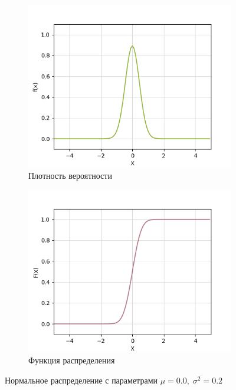 \begin{figure}[H]
	\begin{subfigure}{.5\textwidth}
		\centering
		\includegraphics[width=.8\linewidth]{assets/normpdf00-02.png}
		\caption{Плотность вероятности}
		\label{fig:normpdf00-02}
	\end{subfigure}%
	\begin{subfigure}{.5\textwidth}
		\centering
		\includegraphics[width=.8\linewidth]{assets/normcdf00-02.png}
		\caption{Функция распределения}
		\label{fig:normcdf00-02}
	\end{subfigure}
	\caption{Нормальное распределение с параметрами $\mu = 0.0, \; \sigma^2 = 0.2$}
	\label{fig:norm00-02}
\end{figure}

